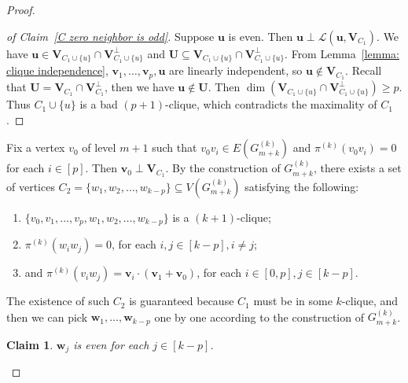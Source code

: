 \documentclass[10pt,a4paper]{amsart}
\newtheorem{claim}{Claim}
\begin{document}
\begin{proof}
\begin{proof}[of Claim~\ref{C zero neighbor is odd}]
Suppose $\textbf{u}$ is even. Then $\textbf{u}\perp \mathcal{L}(\textbf{u},\textbf{V}_{C_1})$. We have $\textbf{u}\in \textbf{V}_{C_1\cup\{u\}}\cap \textbf{V}_{C_1\cup\{u\}}^{\perp}$ and $\textbf{U}\subseteq \textbf{V}_{C_1\cup\{u\}}\cap \textbf{V}_{C_1\cup\{u\}}^{\perp}$. 
From Lemma~\ref{lemma: clique independence}, $\mathbf{v}_1, \ldots, \mathbf{v}_p, \mathbf{u}$ are linearly independent, so $\mathbf{u} \notin \textbf{V}_{C_1}$.
Recall that $\mathbf{U} = \mathbf{V}_{C_1} \cap \mathbf{V}_{C_1}^{\perp}$, then we have $\mathbf{u} \notin \mathbf{U}$.
Then $\dim(\textbf{V}_{C_1\cup\{u\}}\cap \textbf{V}_{C_1\cup\{u\}}^{\perp})\ge p$. Thus $ C_1\cup \{u\}$ is a bad $(p+1)$-clique, which contradicts the maximality of $C_1$. %
\end{proof}
\vspace{.2cm}

Fix a vertex $v_0$ of level $m+1$ such that $v_0v_i\in E(G^{(k)}_{m+k})$ and $\pi^{(k)}(v_0v_i)=0$ for each $i\in[p]$. Then $\mathbf{v}_0 \perp \mathbf{V}_{C_1}$.
By the construction of $G^{(k)}_{m+k}$, there exists a set of vertices $C_2=\{w_1,w_2,\dots, w_{k-p}\} \subseteq V(G^{(k)}_{m+k})$ satisfying the following:
\begin{enumerate}
    \item $\{v_0,v_1,\ldots,v_p,w_1,w_2,\ldots, w_{k-p}\}$ is a $(k+1)$-clique;
    \item $\pi^{(k)}(w_i w_j)=0$, for each $i,j\in[k-p], i\neq j$;
    \item and $\pi^{(k)}(v_i w_j)=\textbf{v}_i \cdot (\textbf{v}_1+\textbf{v}_0)$, for each $i\in[0,p],j\in[k-p]$.
\end{enumerate}

The existence of such $C_2$ is guaranteed because $C_1$ must be in some $k$-clique, and then we can pick $\mathbf{w}_1, \ldots, \mathbf{w}_{k-p}$ one by one according to the construction of $G^{(k)}_{m+k}$.

\begin{claim}\label{w even}
    $\textbf{w}_j$ is even for each $j\in[k-p]$.
\end{claim}


\end{proof}
\end{document}
